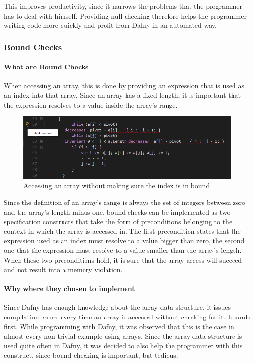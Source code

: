 This improves productivity, since it narrows the problems that the programmer has to deal with himself. Providing null checking therefore helps the programmer writing code more quickly and profit from Dafny in an automated way.

\subsubsection{Bound Checks}
\paragraph{What are Bound Checks}
When accessing an array, this is done by providing an expression that is used as an index into that array. Since an array has a fixed length, it is important that the expression resolves to a value inside the array's range. \newline
\begin{figure}[H]
	\centering
	\includegraphics[width=1\textwidth]{img/indexOutRangeDiag}
	\caption{Accessing an array without making sure the index is in bound}
	\label{fig:dfindexOutOfRange}
\end{figure}
Since the definition of an array's range is always the set of integers between zero and the array's length minus one, bound checks can be implemented as two specification constructs that take the form of preconditions belonging to the context in which the array is accessed in. \newline
The first precondition states that the expression used as an index must resolve to a value bigger than zero, the second one that the expression must resolve to a value smaller than the array's length. When these two preconditions hold, it is sure that the array access will succeed and not result into a memory violation. 

\paragraph{Why where they chosen to implement}
Since Dafny has enough knowledge about the array data structure, it issues compilation errors every time an array is accessed without checking for its bounds first. While programming with Dafny, it was observed that this is the case in almost every non trivial example using arrays. Since the array data structure is used quite often in Dafny, it was decided to also help the programmer with this construct, since bound checking is important, but tedious. \newline


